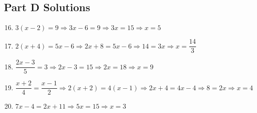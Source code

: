 \documentclass[14pt]{extarticle}
\begin{document}
\subsection*{Part D Solutions}
\begin{enumerate}
    \setcounter{enumi}{15}
    \item \(3(x - 2) = 9 \Rightarrow 3x - 6 = 9 \Rightarrow 3x = 15 \Rightarrow x = 5\)
    \item \(2(x + 4) = 5x - 6 \Rightarrow 2x + 8 = 5x - 6 \Rightarrow 14 = 3x \Rightarrow x = \dfrac{14}{3}\)
    \item \(\dfrac{2x - 3}{5} = 3 \Rightarrow 2x - 3 = 15 \Rightarrow 2x = 18 \Rightarrow x = 9\)
    \item \(\dfrac{x + 2}{4} = \dfrac{x - 1}{2} \Rightarrow 2(x + 2) = 4(x - 1) \Rightarrow 2x + 4 = 4x - 4 \Rightarrow 8 = 2x \Rightarrow x = 4\)
    \item \(7x - 4 = 2x + 11 \Rightarrow 5x = 15 \Rightarrow x = 3\)
\end{enumerate}
\end{document}
